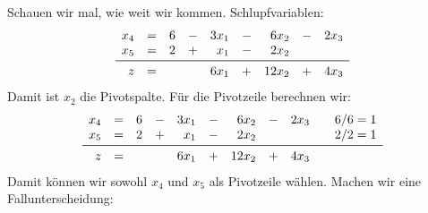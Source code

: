\documentclass[
a4paper, %
11pt,
]
{scrartcl}
\begin{document}
Schauen wir mal, wie weit wir kommen. Schlupfvariablen:
\begin{align*}
  \begin{array}{rcrcrcrcr}
    x_4 & = & 6 & - & 3 x_1 & - & 6 x_2 & - & 2 x_3\\
    x_5 & = & 2 & + &   x_1 & - & 2 x_2\\
    \midrule
    z   & = &   &   & 6 x_1 & + & 12 x_2 & + & 4 x_3
  \end{array}
\end{align*}
Damit ist $x_2$ die Pivotspalte. Für die Pivotzeile berechnen wir:
\begin{align*}
  \begin{array}{rcrcrcrcrcr}
    x_4 & = & 6 & - & 3 x_1 & - &  6 x_2 & - & 2 x_3 & & 6/6 = 1\\
    x_5 & = & 2 & + &   x_1 & - &  2 x_2 &   &       & & 2/2 = 1\\
    \midrule
    z   & = &   &   & 6 x_1 & + & 12 x_2 & + & 4 x_3
  \end{array}
\end{align*}
Damit können wir sowohl $x_4$ und $x_5$ als Pivotzeile wählen. Machen wir eine
Fallunterscheidung:
\end{document}
